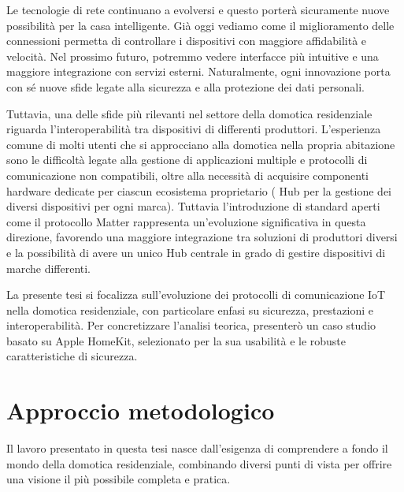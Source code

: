 \vspace{0.5cm}
Le tecnologie di rete continuano a evolversi e questo porterà sicuramente nuove possibilità per la casa intelligente. Già oggi vediamo come il miglioramento delle connessioni permetta di controllare i dispositivi con maggiore affidabilità e velocità. Nel prossimo futuro, potremmo vedere interfacce più intuitive e una maggiore integrazione con servizi esterni. Naturalmente, ogni innovazione porta con sé nuove sfide legate alla sicurezza e alla protezione dei dati personali.

\vspace{0.5cm}
Tuttavia, una delle sfide più rilevanti nel settore della domotica residenziale riguarda l'interoperabilità tra dispositivi di differenti produttori. L'esperienza comune di molti utenti che si approcciano alla domotica nella propria abitazione sono le difficoltà legate alla gestione di applicazioni multiple e protocolli di comunicazione non compatibili, oltre alla necessità di acquisire componenti hardware dedicate per ciascun ecosistema proprietario ( Hub per la gestione dei diversi dispositivi per ogni marca).  Tuttavia l'introduzione di standard aperti come il protocollo Matter rappresenta un'evoluzione significativa in questa direzione, favorendo una maggiore integrazione tra soluzioni di produttori diversi e la possibilità di avere un unico Hub centrale in grado di gestire dispositivi di marche differenti.

\vspace{0.5cm}
La presente tesi si focalizza sull'evoluzione dei protocolli di comunicazione IoT nella domotica residenziale, con particolare enfasi su sicurezza, prestazioni e interoperabilità. Per concretizzare l'analisi teorica, presenterò un caso studio basato su Apple HomeKit, selezionato per la sua usabilità e le robuste caratteristiche di sicurezza.

\section{Approccio metodologico}
Il lavoro presentato in questa tesi nasce dall'esigenza di comprendere a fondo il mondo della domotica residenziale, combinando diversi punti di vista per offrire una visione il più possibile completa e pratica.

